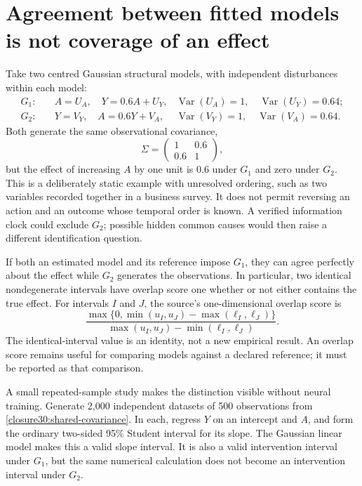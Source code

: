 \section{Agreement between fitted models is not coverage of an effect}

Take two centred Gaussian structural models, with independent disturbances
within each model:
\begin{align}
 G_1:&\quad A=U_A,\quad Y=0.6A+U_Y,
 &\operatorname{Var}(U_A)=1,\quad\operatorname{Var}(U_Y)=0.64;\nonumber\\
 G_2:&\quad Y=V_Y,\quad A=0.6Y+V_A,
 &\operatorname{Var}(V_Y)=1,\quad\operatorname{Var}(V_A)=0.64.
 \label{closure30:two-gaussian-worlds}
\end{align}
Both generate the same observational covariance,
\begin{equation}
 \Sigma=\begin{pmatrix}1&0.6\\0.6&1\end{pmatrix},
 \label{closure30:shared-covariance}
\end{equation}
but the effect of increasing $A$ by one unit is $0.6$ under $G_1$ and zero
under $G_2$. This is a deliberately static example with unresolved ordering,
such as two variables recorded together in a business survey. It does not
permit reversing an action and an outcome whose temporal order is known.
A verified information clock could exclude $G_2$; possible hidden common
causes would then raise a different identification question.

If both an estimated model and its reference impose $G_1$, they can agree
perfectly about the effect while $G_2$ generates the observations. In
particular, two identical nondegenerate intervals have overlap score one
whether or not either contains the true effect. For intervals $I$ and $J$,
the source's one-dimensional overlap score is
\begin{equation}
 \frac{\max\{0,\min(u_I,u_J)-\max(\ell_I,\ell_J)\}}
 {\max(u_I,u_J)-\min(\ell_I,\ell_J)}.
 \label{closure30:interval-agreement}
\end{equation}
The identical-interval value is an identity, not a new empirical result.
An overlap score remains useful for comparing models against a declared
reference; it must be reported as that comparison.
\citep[p.~61, equations (23)--(24)]{closure30molero}

A small repeated-sample study makes the distinction visible without neural
training. Generate 2,000 independent datasets of 500 observations from
\eqref{closure30:shared-covariance}. In each, regress $Y$ on an intercept and
$A$, and form the ordinary two-sided 95\% Student interval for its slope.
The Gaussian linear model makes this a valid slope interval. It is also a
valid intervention interval under $G_1$, but the same numerical calculation
does not become an intervention interval under $G_2$.

